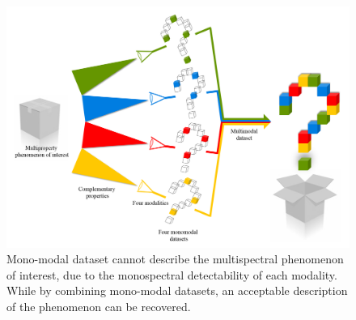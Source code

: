 \begin{figure}[!b]
\centering
\includegraphics[width=1\textwidth]{images/Multimodality.png} %
\caption{Mono-modal dataset cannot describe the multispectral phenomenon of interest, due to the monospectral detectability of each modality. 
While by combining mono-modal datasets, an acceptable description of the phenomenon can be recovered.}
\label{fig:Multimodality}
\end{figure}